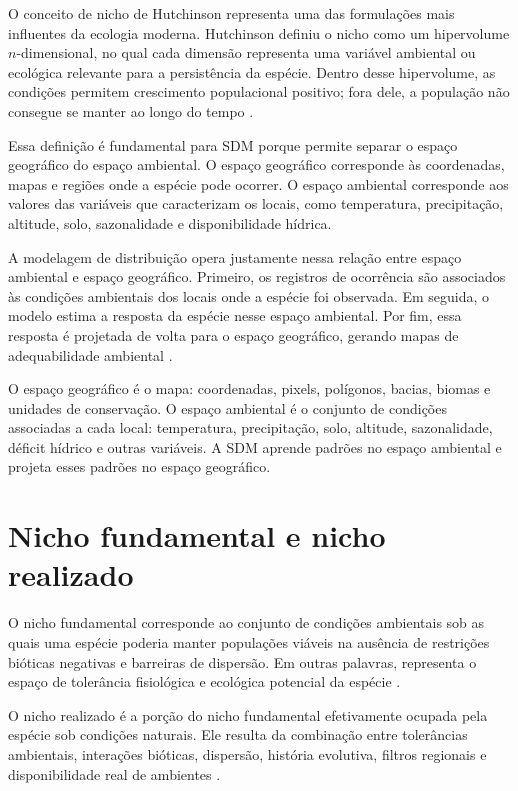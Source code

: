 \documentclass{ueap-sdm}
\begin{document}
O conceito de nicho de Hutchinson representa uma das formulações mais influentes da ecologia moderna. Hutchinson definiu o nicho como um hipervolume $n$-dimensional, no qual cada dimensão representa uma variável ambiental ou ecológica relevante para a persistência da espécie. Dentro desse hipervolume, as condições permitem crescimento populacional positivo; fora dele, a população não consegue se manter ao longo do tempo \parencite{hutchinson1957,colwell2009}.

Essa definição é fundamental para SDM porque permite separar o espaço geográfico do espaço ambiental. O espaço geográfico corresponde às coordenadas, mapas e regiões onde a espécie pode ocorrer. O espaço ambiental corresponde aos valores das variáveis que caracterizam os locais, como temperatura, precipitação, altitude, solo, sazonalidade e disponibilidade hídrica.

A modelagem de distribuição opera justamente nessa relação entre espaço ambiental e espaço geográfico. Primeiro, os registros de ocorrência são associados às condições ambientais dos locais onde a espécie foi observada. Em seguida, o modelo estima a resposta da espécie nesse espaço ambiental. Por fim, essa resposta é projetada de volta para o espaço geográfico, gerando mapas de adequabilidade ambiental \parencite{guisan2017habitat,raes2018modeling}.

\begin{conceito}
O espaço geográfico é o mapa: coordenadas, pixels, polígonos, bacias, biomas e unidades de conservação. O espaço ambiental é o conjunto de condições associadas a cada local: temperatura, precipitação, solo, altitude, sazonalidade, déficit hídrico e outras variáveis. A SDM aprende padrões no espaço ambiental e projeta esses padrões no espaço geográfico.
\end{conceito}

\section{Nicho fundamental e nicho realizado}

O nicho fundamental corresponde ao conjunto de condições ambientais sob as quais uma espécie poderia manter populações viáveis na ausência de restrições bióticas negativas e barreiras de dispersão. Em outras palavras, representa o espaço de tolerância fisiológica e ecológica potencial da espécie \parencite{hutchinson1957,pulliam2000,soberon2005}.

O nicho realizado é a porção do nicho fundamental efetivamente ocupada pela espécie sob condições naturais. Ele resulta da combinação entre tolerâncias ambientais, interações bióticas, dispersão, história evolutiva, filtros regionais e disponibilidade real de ambientes \parencite{pulliam2000,soberon2009}.
\end{document}
